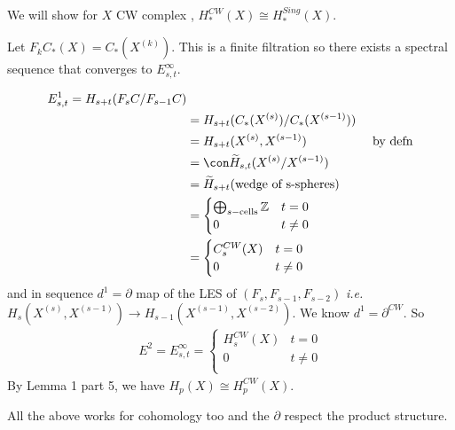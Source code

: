 \documentclass[12pt,class=article,crop=false]{standalone}
\begin{document}
\begin{eg}
We will show for $ X$ CW complex , $H_*^{CW}(X) \cong H_*^{Sing}(X) $.

Let $ F_kC_*(X) = C_*(X^{(k)})$. This is a finite filtration so there exists a spectral sequence that converges to $ E_{s,t}^{\infty}$.

\begin{align*}
	E_{s,t}^{1} = H_{s+t}(F_s C / F_{s-1}C)\\
	&= H_{s+t}(C_*(X^{(s)})/ C_*(X^{(s-1)})) \\
	&= H_{s+t}(X^{(s)}, X^{(s-1)}) & \text{ by defn} \\
	&=\con\widetilde{ H}_{s,t}(X^{(s)} / X^{(s-1)})\\
	&= \widetilde{ H}_{s+t} ( \text{wedge of s-spheres} ) \\
	&= \begin{cases}
		\bigoplus_{ s- \text{cells} } \zz& t=0\\
		0& t \neq 0\\
	\end{cases} \\
	&= \begin{cases}
		C_s^{CW}(X) & t=0\\
		0& t\neq 0\\
	\end{cases} 
\end{align*}
and in sequence $ d^{1} = \partial $ map of the LES of $ (F_s ,F_{s-1}, F_{s-2})$ \emph{i.e.} $ H_s(X^{(s)} , X^{(s-1)}) \to H_{s-1} (X^{(s-1)} , X^{(s-2)})$. We know $ d^{1} = \partial ^{CW}$. So
\begin{align*}
	E^2 = E_{s,t}^{\infty} = \begin{cases}
		H_s^{CW}(X) & t=0\\
		0& t \neq 0\\
	\end{cases}
\end{align*}
By Lemma 1 part 5, we have $ H_p(X) \cong H_p ^{CW}(X)$.
\begin{remark}
All the above works for cohomology too and the $ \partial $ respect the product structure.
\end{remark}
\end{eg}
\end{document}
